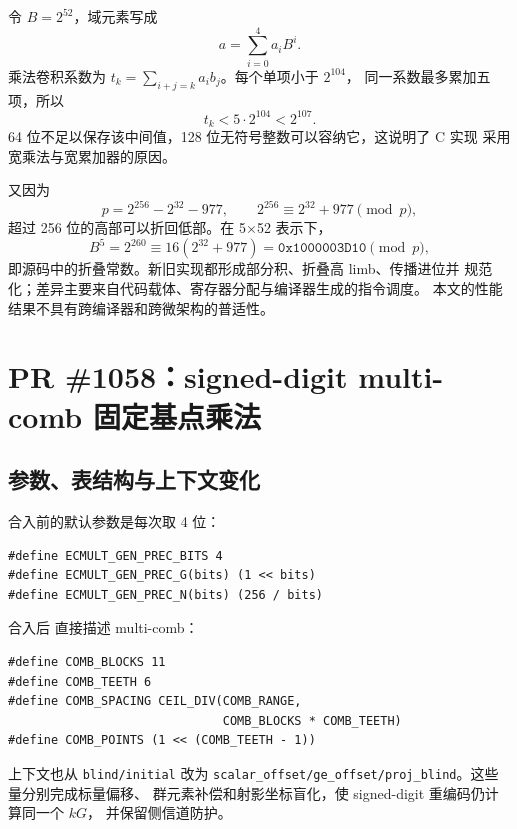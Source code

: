 \documentclass[UTF8,a4paper,zihao=-4]{ctexart}
\begin{document}
令 \(B=2^{52}\)，域元素写成
\begin{equation}
a=\sum_{i=0}^{4}a_iB^i .
\end{equation}
乘法卷积系数为 \(t_k=\sum_{i+j=k}a_ib_j\)。每个单项小于 \(2^{104}\)，
同一系数最多累加五项，所以
\begin{equation}
t_k<5\cdot2^{104}<2^{107}.
\end{equation}
64 位不足以保存该中间值，128 位无符号整数可以容纳它，这说明了 C 实现
采用宽乘法与宽累加器的原因。

又因为
\begin{equation}
p=2^{256}-2^{32}-977,\qquad
2^{256}\equiv2^{32}+977\pmod p,
\end{equation}
超过 256 位的高部可以折回低部。在 5$\times$52 表示下，
\begin{equation}
B^5=2^{260}\equiv16(2^{32}+977)
=\mathtt{0x1000003D10}\pmod p,
\end{equation}
即源码中的折叠常数。新旧实现都形成部分积、折叠高 limb、传播进位并
规范化；差异主要来自代码载体、寄存器分配与编译器生成的指令调度。
本文的性能结果不具有跨编译器和跨微架构的普适性。

\section{PR \#1058：signed-digit multi-comb 固定基点乘法}

\subsection{参数、表结构与上下文变化}

合入前的默认参数是每次取 4 位：

\begin{lstlisting}[style=CStyle,caption={合入前的固定基点预计算参数}]
#define ECMULT_GEN_PREC_BITS 4
#define ECMULT_GEN_PREC_G(bits) (1 << bits)
#define ECMULT_GEN_PREC_N(bits) (256 / bits)
\end{lstlisting}

合入后  直接描述 multi-comb：

\begin{lstlisting}[style=CStyle,caption={合入后的默认 multi-comb 参数}]
#define COMB_BLOCKS 11
#define COMB_TEETH 6
#define COMB_SPACING CEIL_DIV(COMB_RANGE,
                              COMB_BLOCKS * COMB_TEETH)
#define COMB_POINTS (1 << (COMB_TEETH - 1))
\end{lstlisting}

上下文也从 \texttt{blind/initial} 改为
\texttt{scalar\_offset/ge\_offset/proj\_blind}。这些量分别完成标量偏移、
群元素补偿和射影坐标盲化，使 signed-digit 重编码仍计算同一个 \(kG\)，
并保留侧信道防护。
\end{document}
